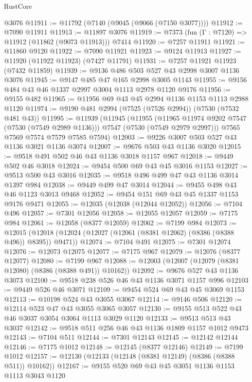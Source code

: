 \begin{lexlean}{RustCore}
\begin{coremodule}
    @3076
@11911 := @11792 (@7140 (@9045 (@9066 (@7150 @3077))))
@11912 := @7090 @11911
@11913 := @11897 @3076
@11919 := @7373 (fun (Γ : @7120) => @11912 (@11862 (@9073 @11913))) @7414
@11920 := @7257 @11911
@11921 := @11860 @9120
@11922 := @7090 @11921
@11923 := @9124 @11913
@11927 := @11920 (@11922 @11923) (@7427 @11791)
@11931 := @7257 @11921 @11923 (@7432 @11859)
@11939 := @9136 @486 @503 @527 @43 @2998 @3007 @1136 @3076
@11945 := @9147 @485 @47 @165 @2998 @3005 @1143
@11955 := @9156 @484 @43 @46 @1337 @2997 @3004 @1113 @2978 @1120 @9176
@11956 := @9155 @482
@11965 := @11956 @69 @43 @45 @2994 @1136 @1153 @1113 @2988 @1120
@11974 := @9190 @481 @2994 (@7525 (@7526 @2994)) (@7530 (@7532 @481 @43))
@11995 := @11939
    (@11945
      (@11955
        (@11965 @11974 @9202 @7547 (@7530 (@7549 @2989 @1136)))
        @7547
        (@7530 (@7549 @2979 @2997)))
      @7565
      @7569
      @7574
      @7579
      @7585
      @7594)
@12003 := @9226 @3007 @503 @527 @43 @1136 @3021 @1136 @3074
@12007 := @9676 @503 @43 @1136 @3020
@12015 := @9518 @491 @502 @46 @43 @1136 @3018 @1157 @967
@12018 := @9449 @502 @46 @3018
@12024 := @9454 @500 @69 @43 @45 @3016 @1153
@12027 := @9513 @500 @43 @3016
@12035 := @9518 @496 @499 @47 @43 @1136 @3014 @1397 @984
@12038 := @9449 @499 @47 @3014
@12044 := @9455 @498 @43 @46 @1123 @3013 @9468
@12052 := @9454 @151 @69 @43 @45 @1337 @1153 @9176 @9471
@12055 := @12035 (@12038 (@12044 @12052))
@12056 := @7104 @496
@12057 := @7301 @12056
@12058 := @12055 @12057
@12059 := @7175 @984
@12061 := @12058 (@8377 @12059)
@12062 := @7199 @984
@12073 := @12015 (@12018 (@12024 (@12027 (@12061 (@8381 @12062) (@8386 (@8388 @496)) @8395)) @9471))
@12074 := @7104 @491
@12075 := @7301 @12074
@12076 := @12073 @12075
@12077 := @7175 @967
@12079 := @12076 (@8377 @12077)
@12080 := @7199 @967
@12088 := @12003 (@12007 (@12079 (@8381 @12080) (@8386 (@8388 @491)) @10162))
@12092 := @9676 @527 @43 @1136 @3073
@12100 := @9518 @238 @526 @46 @43 @1136 @3071 @1157 @996
@12103 := @9449 @526 @46 @3071
@12109 := @9454 @524 @69 @43 @45 @3069 @1153
@12113 := @10198 @524 @43 @3055 @3067
@12114 := @9146 @506
@12120 := @12114 @523 @47 @43 @3055 @3065 @3057
@12130 := @9155 @513 @522 @43 @46 @3037 @3054 @3064 @1113 @3029 @1120
@12133 := @9513 @513 @43 @3037
@12142 := @9518 @511 @256 @46 @43 @1136 @1809 @1157 @1012 @9473
@12143 := @7104 @511
@12144 := @7301 @12143
@12145 := @12142 @12144
@12146 := @7175 @1012
@12148 := @12145 (@8377 @12146)
@12149 := @7199 @1012
@12157 := @12130 (@12133 (@12148 (@8381 @12149) (@8386 (@8388 @511)) @10162))
@12167 := @9155 @520 @69 @43 @45 @3051 @1136 @1153 @1113 @3043 @1120

\end{coremodule}
\end{lexlean}
